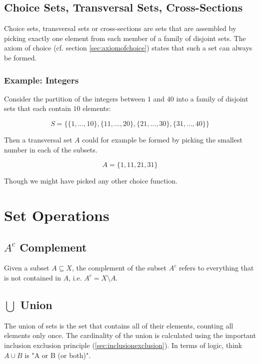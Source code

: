 \subsection{Choice Sets, Transversal Sets, Cross-Sections}
\label{sec:choicesets}
Choice sets, transversal sets or cross-sections are sets that are assembled by picking exactly one element from each member of a family of disjoint sets. The axiom of choice (cf. section \ref{sec:axiomofchoice}) states that such a set can always be formed.

\subsubsection{Example: Integers}
Consider the partition of the integers between $1$ and $40$ into a family of disjoint sets that each contain $10$ elements: 

\begin{equation}
S = \{ \{1,...,10\}, \{11,...,20\}, \{21,...,30\},\{31,...,40\} \}
\end{equation}

Then a transversal set $A$ could for example be formed by picking the smallest number in each of the subsets. 

\begin{equation}
A = \{1,11,21,31\}
\end{equation}

Though we might have picked any other choice function.  


\section{Set Operations}

\subsection{$A^c$ Complement}
Given a subset $A \subseteq X$, the complement of the subset $A^c$ refers to everything that is not contained in $A$, i.e. $A^c = X\setminus A$. 


\subsection{$\bigcup$ Union}
The union of sets is the set that contains all of their elements, counting all elements only once. The cardinality of the union is calculated using the important inclusion exclusion principle (\ref{sec:inclusionexclusion}). In terms of logic, think $A\cup B$ is "A or B (or both)".

